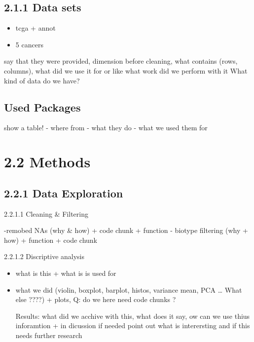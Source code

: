 \documentclass[
  parskip,
  oneside]{scrreprt}
\providecommand{\tightlist}{%
  \setlength{\itemsep}{0pt}\setlength{\parskip}{0pt}}
\begin{document}
\hypertarget{data-sets}{%
\subsection{2.1.1 Data sets}\label{data-sets}}

\begin{itemize}
\tightlist
\item
  tcga + annot
\item
  5 cancers
\end{itemize}

say that they were provided, dimension before cleaning, what contains
(rows, columns), what did we use it for or like what work did we perform
with it What kind of data do we have?

\hypertarget{used-packages}{%
\subsection{Used Packages}\label{used-packages}}

show a table! - where from - what they do - what we used them for

\hypertarget{methods}{%
\section{2.2 Methods}\label{methods}}

\hypertarget{data-exploration}{%
\subsection{2.2.1 Data Exploration}\label{data-exploration}}

2.2.1.1 Cleaning \& Filtering

-remobed NAs (why \& how) + code chunk + function - biotype filtering
(why + how) + function + code chunk

2.2.1.2 Discriptive analysis

\begin{itemize}
\item
  what is this + what is is used for
\item
  what we did (violin, boxplot, barplot, histos, variance mean, PCA
  \ldots{} What else ????) + plots, Q: do we here need code chunks ?

  Results: what did we acchive with this, what does it say, ow can we
  use thius inforamtion + in dicussion if needed point out what is
  interersting and if this needs further research
\end{itemize}
\end{document}
